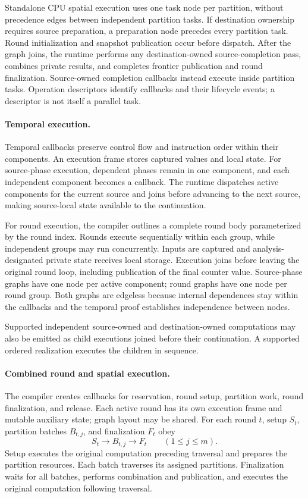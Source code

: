 Standalone CPU spatial execution uses one task node per partition,
without precedence edges between independent partition tasks. If
destination ownership requires source preparation, a preparation node
precedes every partition task. Round initialization and snapshot
publication occur before dispatch. After the graph joins, the runtime
performs any destination-owned source-completion pass, combines private
results, and completes frontier publication and round finalization.
Source-owned completion callbacks instead execute inside partition
tasks. Operation descriptors identify callbacks and their lifecycle
events; a descriptor is not itself a parallel task.

\paragraph{Temporal execution.}
Temporal callbacks preserve control flow and instruction order within
their components. An execution frame stores captured values and local
state. For source-phase execution, dependent phases remain in one
component, and each independent component becomes a callback. The
runtime dispatches active components for the current source and joins
before advancing to the next source, making source-local state available
to the continuation.

For round execution, the compiler outlines a complete round body
parameterized by the round index. Rounds execute sequentially within
each group, while independent groups may run concurrently. Inputs are
captured and analysis-designated private state receives local storage.
Execution joins before leaving the original round loop, including
publication of the final counter value. Source-phase graphs have one
node per active component; round graphs have one node per round group.
Both graphs are edgeless because internal dependences stay within the
callbacks and the temporal proof establishes independence between nodes.

Supported independent source-owned and destination-owned computations
may also be emitted as child executions joined before their continuation.
A supported ordered realization executes the children in sequence.

\paragraph{Combined round and spatial execution.}
The compiler creates callbacks for reservation, round setup, partition
work, round finalization, and release. Each active round has its own
execution frame and mutable auxiliary state; graph layout may be shared.
For each round $t$, setup $S_t$, partition batches $B_{t,j}$, and
finalization $F_t$ obey
\[
S_t\longrightarrow B_{t,j}\longrightarrow F_t
\qquad(1\le j\le m).
\]
Setup executes the original computation preceding traversal and prepares
the partition resources. Each batch traverses its assigned partitions.
Finalization waits for all batches, performs combination and publication,
and executes the original computation following traversal.

